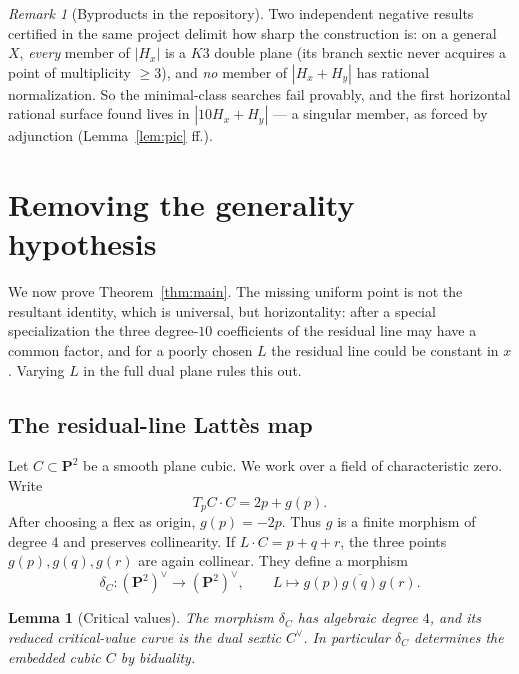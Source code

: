 \documentclass[11pt]{amsart}
\newtheorem{lemma}[theorem]{Lemma}
\theoremstyle{definition}
\theoremstyle{remark}
\newtheorem{remark}[theorem]{Remark}
\newcommand{\PP}{\mathbf{P}}
\newcommand{\Hx}{H_x}
\newcommand{\Hy}{H_y}
\begin{document}
\begin{remark}[Byproducts in the repository]
Two independent negative results certified in the same project delimit how
sharp the construction is: on a general $X$, \emph{every} member of
$|\Hx|$ is a $K3$ double plane (its branch sextic never acquires a point
of multiplicity $\ge3$), and \emph{no} member of $|\Hx+\Hy|$ has rational
normalization.  So the minimal-class searches fail provably, and the first
horizontal rational surface found lives in $|10\Hx+\Hy|$ --- a singular
member, as forced by adjunction (Lemma~\ref{lem:pic} ff.).
\end{remark}

\section{Removing the generality hypothesis}\label{sec:all-smooth}

We now prove Theorem~\ref{thm:main}.  The missing uniform point is not the
resultant identity, which is universal, but horizontality: after a special
specialization the three degree-$10$ coefficients of the residual line may
have a common factor, and for a poorly chosen $L$ the residual line could be
constant in $x$.  Varying $L$ in the full dual plane rules this out.

\subsection{The residual-line Latt\`es map}

Let $C\subset\PP^2$ be a smooth plane cubic.  We work over a field of
characteristic zero.  Write
\[
T_pC\cdot C=2p+g(p).
\]
After choosing a flex as origin, $g(p)=-2p$.  Thus $g$ is a finite morphism
of degree $4$ and preserves collinearity.  If $L\cdot C=p+q+r$, the three
points $g(p),g(q),g(r)$ are again collinear.  They define a morphism
\[
\delta_C:(\PP^2)^\vee\longrightarrow(\PP^2)^\vee,
\qquad L\longmapsto\overline{g(p)g(q)g(r)}.
\tag{4.1}
\]

\begin{lemma}[Critical values]\label{lem:lattes}
The morphism $\delta_C$ has algebraic degree $4$, and its reduced
critical-value curve is the dual sextic $C^\vee$.  In particular
$\delta_C$ determines the embedded cubic $C$ by biduality.
\end{lemma}
\end{document}
